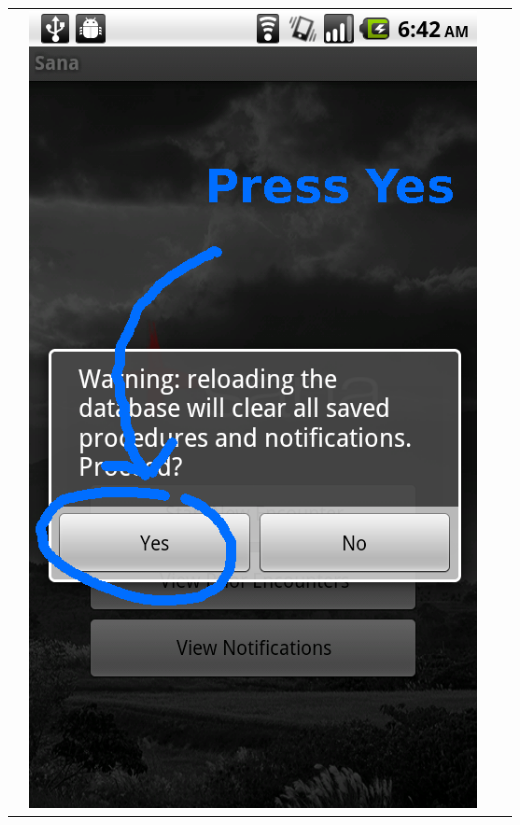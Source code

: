 \documentclass[a4paper,10pt]{article}
\begin{document}
\begin{flushleft}
\begin{tabular}{ c c c c }
&\includegraphics[scale=0.15,keepaspectratio=true]{sana_splash_load_db_confirm.png}

\end{tabular}
\end{flushleft}
\end{document}

